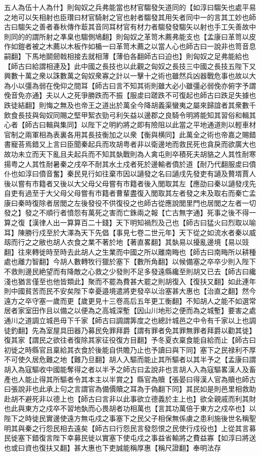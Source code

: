 五人為伍十人為什】則匈奴之兵弗能當也材官騶發矢道同的【如淳曰騶矢也處平易之地可以矢相射也臣瓚曰材官騎射之官也射者騶發其用矢者同中一的言其工妙也師古曰騶矢之善者春秋傳作菆其音同耳材官有材力者騶發發騶矢以射也手工矢善故中則同的的謂所射之凖臬也騶側鳩翻】則匈奴之革笥木薦弗能支也【孟康曰革笥以皮作如鎧者被之木薦以木板作如楯一曰革笥木薦之以當人心也師古曰一說非也笥音息嗣翻】下馬地鬬劒戟相接去就相薄【薄伯各翻師古曰迫也】則匈奴之足弗能給也【師古曰給謂相連及】此中國之長技也以此觀之匈奴之長技三中國之長技五陛下又興數十萬之衆以誅數萬之匈奴衆寡之計以一擊十之術也雖然兵凶器戰危事也故以大為小以彊為弱在俛仰之間耳【師古曰言不知其術則雖大必小雖彊必弱俛亦俯字予謂俛音免亦通】夫以人之死爭勝跌而不振【服䖍曰蹉跌不可復起也師古曰跌足失據也跌徒結翻】則悔之無及也帝王之道出於萬全今降胡義渠蠻夷之屬來歸誼者其衆數千飲食長技與匈奴同賜之堅甲絮衣勁弓利矢益以邊郡之良騎令明將能知其習俗和輯其心者【師古曰輯與集同】以陛下之明約將之即有險阻以此當之平地通道則以輕車材官制之兩軍相為表裏各用其長技衡加之以衆【衡與横同】此萬全之術也帝嘉之賜錯書寵荅焉錯又上言曰臣聞秦起兵而攻胡粤者非以衛邊地而救民死也貪戾而欲廣大也故功未立而天下亂且夫起兵而不知其埶戰則為人禽屯則卒積死夫胡貉之人其性耐寒揚粤之人其性耐暑秦之戌卒不耐其水土戍者死於邊輸者僨於道【耐乃代翻服䖍曰僨仆也如淳曰僨音奮】秦民見行如往棄市因以讁發之名曰讁戌先發吏有讁及贅壻賈人後以嘗有市籍者又後以大父母父母嘗有市籍者後入閭取其左【應劭曰秦以讁發戌先自吏有過至于大父母父母嘗有市籍者曹輩盡復入閭取其左者發之未及取右而秦亡孟康曰秦時復除者居閭之左後發役不供復役之也師古從應說閭里門也居閭之左者一切發之】發之不順行者憤怨有萬死之害而亡銖兩之報【亡古無字通】死事之後不得一算之復【漢律人出一算算百二十錢】天下明知禍烈及己也【師古曰猛火曰烈取以喻耳】陳勝行戍至於大澤為天下先倡【事見七卷二世元年】天下從之如流水者秦以威刼而行之之敝也胡人衣食之業不著於地【著直畧翻】其埶易以擾亂邊境【易以豉翻】往來轉徙時至時去此胡人之生業而中國之所以離南畮也【師古曰南畮所以耕種處也離力智翻】今胡人數轉牧行獵於塞下【數所角翻】以候備塞之卒卒少則入陛下不救則邊民絶望而有降敵之心救之少發則不足多發遠縣纔至則胡又已去【師古曰纔淺也猶言僅至也他皆類此】聚而不罷為費甚大罷之則胡復入【復扶又翻】如此連年則中國貧苦而民不安矣陛下幸憂邉境遣將吏發卒以治塞甚大惠也【治直之翻】然今遠方之卒守塞一歲而更【歲更見十三卷高后五年更工衡翻】不知胡人之能不如選常居者家室田作且以備之以便為之高城深塹【因山川地形之便而為之城塹】要害之處通川之道調立城邑毋下千家【師古曰調謂筭度之也總計城邑之中令有千家以上也調徒釣翻】先為室屋具田器乃募民免罪拜爵【謂有罪者免其罪無罪者拜爵以勸其徙】復其家【謂民之欲往者復除其家征役復方目翻】予冬夏衣稟食能自給而止【師古曰初徙之時縣官且稟給其衣食於後能自供贍乃止也予讀曰與下同】塞下之民禄利不厚不可使久居危難之地【難乃旦翻】胡人入驅而能止其所驅者以其半予之【孟康曰謂胡入為寇驅收中國能奪得之者以半予之師古曰孟說非也言胡人入為寇驅畧漢人及畜產也人能止得其所驅者令其本主以半賞之】縣官為贖【張晏曰得漢人官為贖也師古曰張說非也此承上句之言謂官為備價贖之耳為于偽翻下同】其民如是則邑里相救助赴胡不避死非以德上也【師古曰言非以此事欲立德義於主上也】欲全親戚而利其財也此與東方之戍卒不習地埶而心畏胡者功相萬也【言其功萬倍于東方之戍卒也】以陛下之時徙民實邊使遠方無屯戍之事塞下之民父子相保無係虜之患利施後世名稱聖明其與秦之行怨民相去遠矣【師古曰行怨民言發怨恨之民使行戍役也】上從其言募民徙塞下錯復言陛下幸募民徙以實塞下使屯戍之事益省輸將之費益寡【如淳曰將送也或曰資也復扶又翻】甚大惠也下吏誠能稱厚惠【稱尺證翻】奉明法存